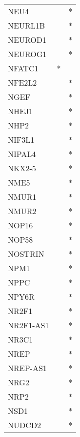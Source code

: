 \begin{longtable}{lcc}
NEU4            &                &          * \\
NEURL1B         &                &          * \\
NEUROD1         &                &          * \\
NEUROG1         &                &          * \\
NFATC1          &              * &            \\
NFE2L2          &                &          * \\
NGEF            &                &          * \\
NHEJ1           &                &          * \\
NHP2            &                &          * \\
NIF3L1          &                &          * \\
NIPAL4          &                &          * \\
NKX2-5          &                &          * \\
NME5            &                &          * \\
NMUR1           &                &          * \\
NMUR2           &                &          * \\
NOP16           &                &          * \\
NOP58           &                &          * \\
NOSTRIN         &                &          * \\
NPM1            &                &          * \\
NPPC            &                &          * \\
NPY6R           &                &          * \\
NR2F1           &                &          * \\
NR2F1-AS1       &                &          * \\
NR3C1           &                &          * \\
NREP            &                &          * \\
NREP-AS1        &                &          * \\
NRG2            &                &          * \\
NRP2            &                &          * \\
NSD1            &                &          * \\
NUDCD2          &                &          * \\

\end{longtable}
